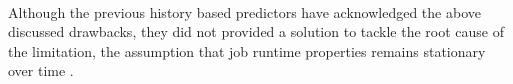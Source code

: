 

\paragraph{}
Although the previous history based predictors have acknowledged
the above discussed drawbacks, they did not provided a solution to tackle the
root cause of the limitation, \ie the assumption that
job runtime properties remains stationary over time \cite{jockey:eurosys2012, 3Sigma, morpheus, jamiasvu}.
\fi
